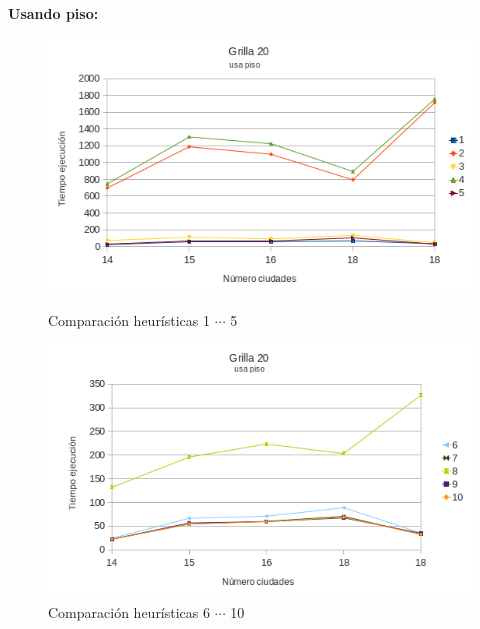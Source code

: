 \documentclass[10pt]{article}
\begin{document}
\newpage

\textbf{Usando piso:}

\begin{figure}[ht]

\begin{minipage}[b]{0.45\linewidth}
 \centering
 \includegraphics[width=\textwidth]{grilla20floor0.png}
 \caption{Comparación heurísticas  1 $\cdots$ 5}
 \label{fig:grid20floor0}
\end{minipage}
\hspace{0.5cm}
\begin{minipage}[b]{0.45\linewidth}
 \centering
 \includegraphics[width=\textwidth]{grilla20floor1.png}
 \caption{Comparación heurísticas  6 $\cdots$ 10}
 \label{fig:grid20floor1}
\end{minipage}


\end{figure}
\end{document}
